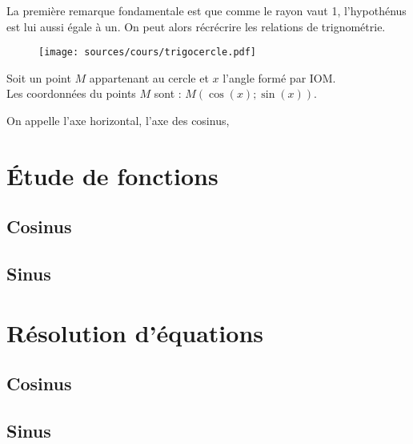 \documentclass[paper=a4, fontsize=11pt]{scrartcl} %
\begin{document}
La première remarque fondamentale est que comme le rayon vaut 1, l'hypothénus est lui aussi égale à un. On peut alors récrécrire les relations de trignométrie.\\


\begin{figure}[h]
  \centering
  \texttt{[image: sources/cours/trigocercle.pdf]}

\end{figure}


\begin{Proposition}
  Soit un point $M$ appartenant au cercle et $x$ l'angle formé par IOM.\\
  Les coordonnées du points $M$ sont : $M(\cos(x) ; \sin(x) )$.
\end{Proposition}
On appelle l'axe horizontal, l'axe des cosinus, 


\section{Étude de fonctions}

\subsection{Cosinus}

\subsection{Sinus}

\section{Résolution d'équations}

\subsection{Cosinus}

\subsection{Sinus}
\end{document}
